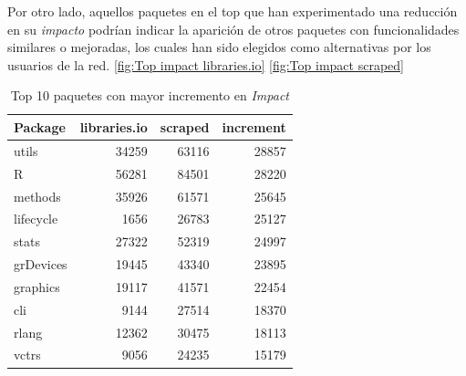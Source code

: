 Por otro lado, aquellos paquetes en el top que han experimentado una reducción en su \textit{impacto}
podrían indicar la aparición de otros paquetes con funcionalidades similares o mejoradas, los cuales han
sido elegidos como alternativas por los usuarios de la red. \ref{fig:Top impact libraries.io} \ref{fig:Top impact scraped}

\begin{table}[ht!]
    \begin{center}
        \begin{tabular}{|l|r|r|r|}
            \hline
            \textbf{Package} & \textbf{libraries.io} & \textbf{scraped} & \textbf{increment} \\
            \hline
            utils            & 34259                 & 63116            & 28857              \\
            R                & 56281                 & 84501            & 28220              \\
            methods          & 35926                 & 61571            & 25645              \\
            lifecycle        & 1656                  & 26783            & 25127              \\
            stats            & 27322                 & 52319            & 24997              \\
            grDevices        & 19445                 & 43340            & 23895              \\
            graphics         & 19117                 & 41571            & 22454              \\
            cli              & 9144                  & 27514            & 18370              \\
            rlang            & 12362                 & 30475            & 18113              \\
            vctrs            & 9056                  & 24235            & 15179              \\
            \hline
        \end{tabular}
        \caption{Top 10 paquetes con mayor incremento en \textit{Impact}}
        \label{tab:Top 10 paquetes con mayor incremento en Impact}
    \end{center}
\end{table}


